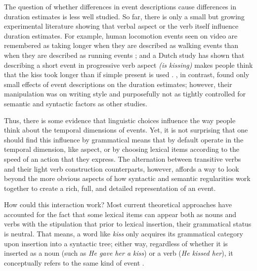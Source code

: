 \documentclass[review,12pt,authoryear]{elsarticle}
\begin{document}
The question of whether differences in event descriptions cause differences in duration estimates is less well studied. So far, there is only a small but growing experimental literature showing that verbal aspect or the verb itself influence duration estimates. For example, human locomotion events seen on video are remembered as taking longer when they are described as walking events than when they are described as running events \citep{burt1996effects}; and a Dutch study has shown that describing a short event in progressive verb aspect \emph{(is kissing)} makes people think that the kiss took longer than if simple present is used \citep{flecken2013grammatical}. \citet{pedersen2002differences}, in contrast, found only small effects of event descriptions on the duration estimates; however, their manipulation was on writing style and purposefully not as tightly controlled for semantic and syntactic factors as other studies. 

Thus, there is some evidence that linguistic choices influence the way people think about the temporal dimensions of events. Yet, it is not surprising that one should find this influence by grammatical means that by default operate in the temporal dimension, like aspect, or by choosing lexical items according to the speed of an action that they express. The alternation between transitive verbs and their light verb construction counterparts, however, affords a way to look beyond the more obvious aspects of how syntactic and semantic regularities work together to create a rich, full, and detailed representation of an event.

How could this interaction work? Most current theoretical approaches have accounted for the fact that some lexical items can appear both as nouns and verbs with the stipulation that prior to lexical insertion, their grammatical status is neutral. That means, a word like \emph{kiss} only acquires its grammatical category upon insertion into a syntactic tree; either way, regardless of whether it is inserted as a noun (such as \emph{He gave her a kiss}) or a verb (\emph{He kissed her}), it conceptually refers to the same kind of event \citep{halle1994some,barner2002no}. 
\end{document}
